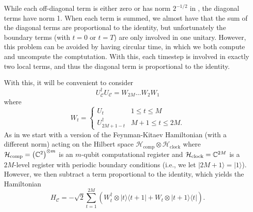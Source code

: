 \documentclass[../thesis-main/thesis-main]{subfiles}
\begin{document}
While each off-diagonal term is either zero or has norm $2^{-1/2}$ in , the diagonal terms have norm 1.  When each term is summed, we almost have that the sum of the diagonal terms are proportional to the identity, but unfortunately the boundary terms (with $t=0$ or $t=T$) are only involved in one unitary.  However, this problem can be avoided by having circular time, in which we both compute and uncompute the comptutation.  With this, each timestep is involved in exactly two local terms, and thus the diagonal term is proportional to the identity.

With this, it will be convenient to consider 
\begin{equation}
  U_{\mathcal{C}}^{\dagger}U_{\mathcal{C}}=W_{2M}\ldots W_{2}W_{1}
\end{equation}
where
\begin{equation}
W_{t}=\begin{cases}
U_{t} & 1\leq t\leq M\\
U_{2M+1-t}^{\dagger} & M+1 \le t \le 2M.
\end{cases}
\end{equation}
As in  we start with a version of the Feynman-Kitaev Hamiltonian (with a different norm) \cite{Fey85,KSV02} acting on the Hilbert space $\mathcal{H}_{\text{comp}} \otimes \mathcal{H}_{\text{clock}}$ where $\mathcal{H}_{\text{comp}} = \left(\mathbb{C}^{2}\right)^{\otimes m}$ is an $m$-qubit computational register and $\mathcal{H}_{\text{clock}}=\mathbb{C}^{2M}$ is a $2M$-level register with periodic boundary conditions (i.e., we let $|2M+1\rangle=|1\rangle$). However, we then subtract a term proportional to the identity, which yields the Hamiltonian
\begin{equation}
  H_{\mathcal{C}}=-\sqrt{2}\sum_{t=1}^{2M}\left(W_{t}^{\dagger}\otimes|t\rangle\langle t+1|+W_{t}\otimes|t+1\rangle\langle t|\right).\label{eq:H_x}
\end{equation}
\end{document}
